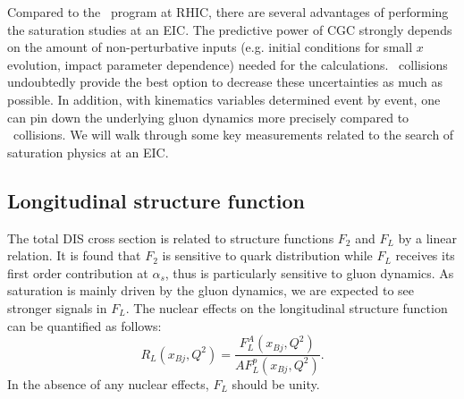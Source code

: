 Compared to the \dA\ program at RHIC, there are several advantages of
performing the saturation studies at an EIC.
The predictive power of CGC strongly depends on the amount of non-perturbative inputs (e.g. initial
conditions for small $x$ evolution, impact parameter dependence) needed for the calculations. 
\eA\ collisions undoubtedly provide the best option to decrease these uncertainties as much as possible. In addition,
with kinematics variables determined event by event, one can pin down the underlying gluon dynamics
more precisely compared to \dA\ collisions. 
We will walk through some key measurements related to the search of saturation physics at an EIC.

\subsection{Longitudinal structure function}
The total DIS cross section is related to structure functions $F_2$ and $F_L$ by
a linear relation. It is found that $F_2$ is sensitive to quark distribution
while $F_L$ receives its first order contribution at $\alpha_s$, thus is
particularly sensitive to gluon dynamics. As saturation is mainly driven by the gluon
dynamics, we are expected to see stronger signals in $F_L$. The nuclear effects on the longitudinal
structure function can be quantified as follows:
\begin{equation}
R_{L}(x_{Bj},Q^{2})=\frac{F^{A}_{L}(x_{Bj},Q^{2})}{AF^{p}_{L}(x_{Bj},Q^{2})}.
\end{equation}
In the absence of any nuclear effects, $F_L$ should be unity. 

